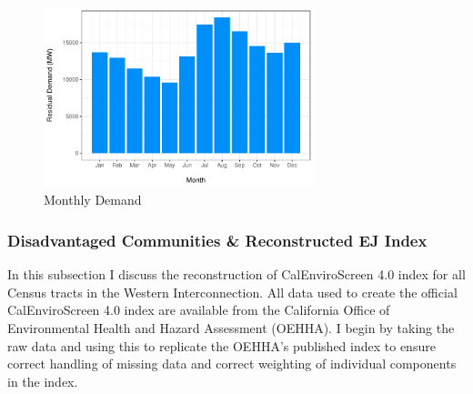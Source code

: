 \begin{figure}
    \centering
    \caption{Monthly Demand \label{monthly_demand}}
    \includegraphics[width=0.7\textwidth]{figures/chapter5_figures/monthly_demand.pdf}
\end{figure}

\newpage
\subsubsection*{Disadvantaged Communities \& Reconstructed EJ Index}

In this subsection I discuss the reconstruction of CalEnviroScreen 4.0 index for all Census tracts in the Western Interconnection. All data used to create the official CalEnviroScreen 4.0 index are available from the California Office of Environmental Health and Hazard Assessment (OEHHA). I begin by taking the raw data and using this to replicate the OEHHA's published index to ensure correct handling of missing data and correct weighting of individual components in the index. 

